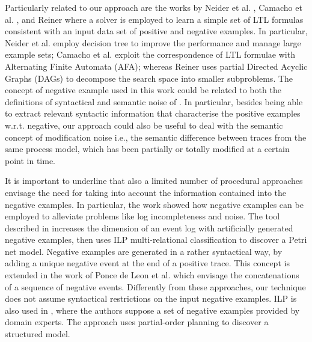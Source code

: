 Particularly related to our approach are the works by Neider et al. \cite{2018-Neider}, Camacho et al. \cite{2019-Camacho}, and Reiner \cite{2019-Riener} where a solver is employed to learn a simple set of LTL formulas consistent with an input data set of positive and negative examples. In particular, Neider et al. \cite{2018-Neider} employ decision tree to improve the performance and manage large example sets; Camacho et al. \cite{2019-Camacho} exploit the correspondence of LTL formulae with Alternating Finite Automata (AFA); whereas Reiner \cite{2019-Riener} uses partial Directed Acyclic Graphs (DAGs) to decompose the search space into smaller subproblems.
The concept of negative example used in this work could be related to both the definitions of syntactical and semantic noise of \cite{2009-Gunther}. In particular, besides being able to extract relevant syntactic information that characterise the positive examples w.r.t. negative, our approach could also be useful to deal with the semantic concept of modification noise i.e., the semantic difference between traces from the same process model, which has been partially or totally modified at a certain point in time.  %
 
It is important to underline that also a limited number of procedural approaches envisage the need for taking into account the information contained into the negative examples. 
In particular, the work \cite{2015-Ponce} showed how negative examples can be employed to alleviate problems like log incompleteness and noise.
The tool described in \cite{2009-Goedertier} increases the dimension of an event log with artificially generated negative examples, then uses \ac{ILP} multi-relational classification to discover a Petri net model. 
Negative examples are generated in a rather syntactical way, by adding a unique negative event at the end of a positive trace. This concept is extended in the work of Ponce de Leon et al. \cite{2018-Ponce} which envisage the concatenations of a sequence of negative events. Differently from these approaches, our technique does not assume syntactical restrictions on the input negative examples.
%
\ac{ILP} is also used in \cite{2006-Ferreira}, where the authors suppose a set of negative examples provided by domain experts. The approach uses partial-order planning to discover a structured model. %
 
